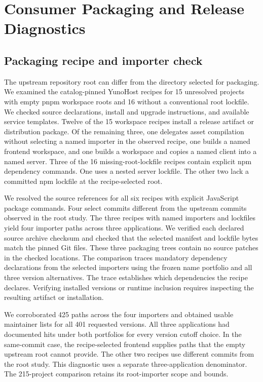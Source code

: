 \section{Consumer Packaging and Release Diagnostics}
\label{sec:consumer_packaging}
\subsection{Packaging recipe and importer check}
The upstream repository root can differ from the directory selected for packaging. We examined the catalog-pinned YunoHost recipes for 15 unresolved projects with empty pnpm workspace roots and 16 without a conventional root lockfile. We checked source declarations, install and upgrade instructions, and available service templates. Twelve of the 15 workspace recipes install a release artifact or distribution package. Of the remaining three, one delegates asset compilation without selecting a named importer in the observed recipe, one builds a named frontend workspace, and one builds a workspace and copies a named client into a named server. Three of the 16 missing-root-lockfile recipes contain explicit npm dependency commands. One uses a nested server lockfile. The other two lack a committed npm lockfile at the recipe-selected root.

We resolved the source references for all six recipes with explicit JavaScript package commands. Four select commits different from the upstream commits observed in the root study. The three recipes with named importers and lockfiles yield four importer paths across three applications. We verified each declared source archive checksum and checked that the selected manifest and lockfile bytes match the pinned Git files. These three packaging trees contain no source patches in the checked locations. The comparison traces mandatory dependency declarations from the selected importers using the frozen name portfolio and all three version alternatives. The trace establishes which dependencies the recipe declares. Verifying installed versions or runtime inclusion requires inspecting the resulting artifact or installation.

We corroborated 425 paths across the four importers and obtained usable maintainer lists for all 401 requested versions. All three applications had documented hits under both portfolios for every version cutoff choice. In the same-commit case, the recipe-selected frontend supplies paths that the empty upstream root cannot provide. The other two recipes use different commits from the root study. This diagnostic uses a separate three-application denominator. The 215-project comparison retains its root-importer scope and bounds.


